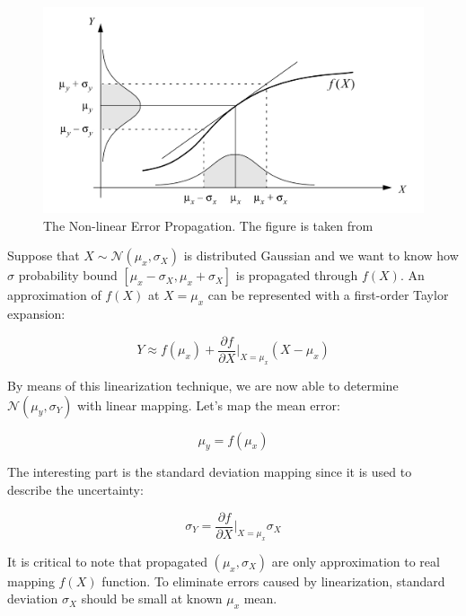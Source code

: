 \documentclass[a4paper]{report}
\numberwithin{figure}{section}
\begin{document}
\begin{figure}[H]
	\centering
	\includegraphics[width=\linewidth,natwidth=640,natheight=640]
	{fig/ref_imgs/error_propagation.jpg}
\caption[The Non-linear Error Propagation]
{The Non-linear Error Propagation. The figure is taken from 
\parencite{Arras1998b}}
  \label{fig:error_propagation}
\end{figure}

Suppose that $X\sim \mathcal{N}(\mu_x, \sigma_X)$ is distributed Gaussian 
and we want to know how $\sigma$ probability bound 
$[\mu_x-\sigma_X, \mu_x+\sigma_X]$ is propagated through $f(X)$.
An approximation of $f(X)$ at $X=\mu_x$ can be represented with 
a first-order Taylor expansion:

\begin{equation}
  Y \approx f(\mu_x) + \frac{\partial f}{\partial X}\bigg|_{X=\mu_x} (X-\mu_x) 
\end{equation}

By means of this linearization technique, we are now able to determine 
$\mathcal{N}(\mu_y, \sigma_Y)$ 
with linear mapping. Let's map the mean error:

\begin{equation}
  \mu_y = f(\mu_x)
\end{equation}

The interesting part is the standard deviation mapping since it 
is used to describe the uncertainty:

\begin{equation}
  \sigma_Y = \frac{\partial f}{\partial X}\bigg|_{X=\mu_x} \sigma_X
\end{equation}

It is critical to note that propagated $(\mu_x, \sigma_X)$ are only 
approximation to real mapping $f(X)$ function. To eliminate errors 
caused by linearization, standard deviation $\sigma_X$ 
should be small at known $\mu_x$ mean. 
\end{document}
